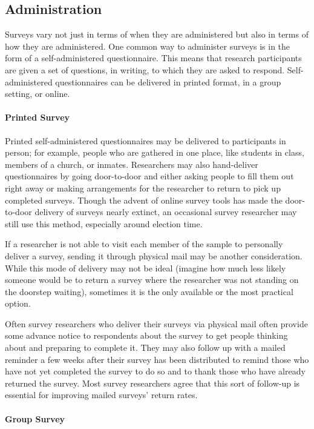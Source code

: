 \subsection{Administration}

Surveys vary not just in terms of when they are administered but also in terms of how they are administered. One common way to administer surveys is in the form of a self-administered \gls{questionnaire}. This means that research participants are given a set of questions, in writing, to which they are asked to respond. Self-administered questionnaires can be delivered in printed format, in a group setting, or online.

\paragraph{Printed Survey}

Printed self-administered questionnaires may be delivered to participants in person; for example, people who are gathered in one place, like students in class, members of a church, or inmates. Researchers may also hand-deliver questionnaires by going door-to-door and either asking people to fill them out right away or making arrangements for the researcher to return to pick up completed surveys. Though the advent of online survey tools has made the door-to-door delivery of surveys nearly extinct, an occasional survey researcher may still use this method, especially around election time.

If a researcher is not able to visit each member of the sample to personally deliver a survey, sending it through physical mail may be another consideration. While this mode of delivery may not be ideal (imagine how much less likely someone would be to return a survey where the researcher was not standing on the doorstep waiting), sometimes it is the only available or the most practical option.

Often survey researchers who deliver their surveys via physical mail often provide some advance notice to respondents about the survey to get people thinking about and preparing to complete it. They may also follow up with a mailed reminder a few weeks after their survey has been distributed to remind those who have not yet completed the survey to do so and to thank those who have already returned the survey. Most survey researchers agree that this sort of follow-up is essential for improving mailed surveys' return rates\cite{babbie2010unobtrusive}.

\paragraph{Group Survey}

